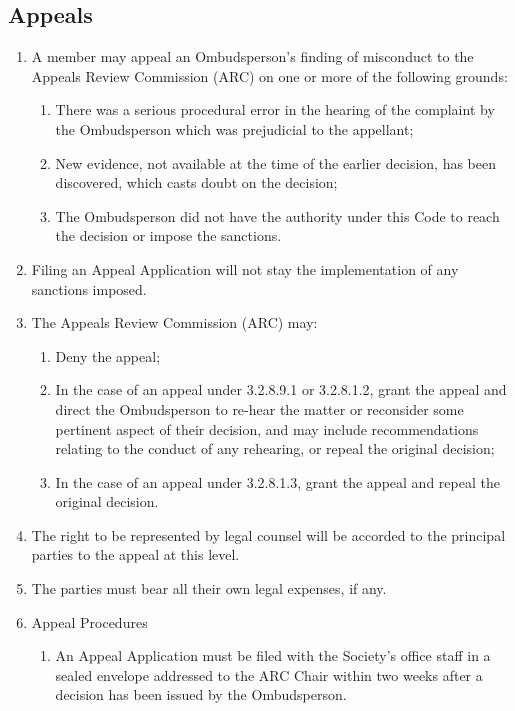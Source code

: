 \subsection{Appeals}
\begin{enumerate} [align=left]
\item A member may appeal an Ombudsperson's finding of misconduct to the Appeals Review Commission (ARC) on one or more of the following grounds:
\begin{enumerate} [label*=\arabic*., align=left]
\item There was a serious procedural error in the hearing of the complaint by the Ombudsperson which was prejudicial to the appellant;
\item New evidence, not available at the time of the earlier decision, has been discovered, which casts doubt on the decision;
\item The Ombudsperson did not have the authority under this Code to reach the decision
or impose the sanctions.
\end{enumerate}
\item Filing an Appeal Application will not stay the implementation of any sanctions imposed. 
\item The Appeals Review Commission (ARC) may:
\begin{enumerate} [label*=\arabic*., align=left]
\item Deny the appeal;
\item In the case of an appeal under 3.2.8.9.1 or 3.2.8.1.2, grant the appeal and direct the Ombudsperson to re-hear the matter or reconsider some pertinent aspect of their decision, and may include recommendations relating to the conduct of any rehearing, or repeal the original decision;
\item In the case of an appeal under 3.2.8.1.3, grant the appeal and repeal the original decision.
\end{enumerate}
\item The right to be represented by legal counsel will be accorded to the principal parties to the appeal at this level.
\item The parties must bear all their own legal expenses, if any.
\item Appeal Procedures
\begin{enumerate} [label*=\arabic*., align=left]
\item An Appeal Application must be filed with the Society's office staff in a sealed envelope addressed to the ARC Chair within two weeks after a decision has been issued by the Ombudsperson.

\end{enumerate}
\end{enumerate}
